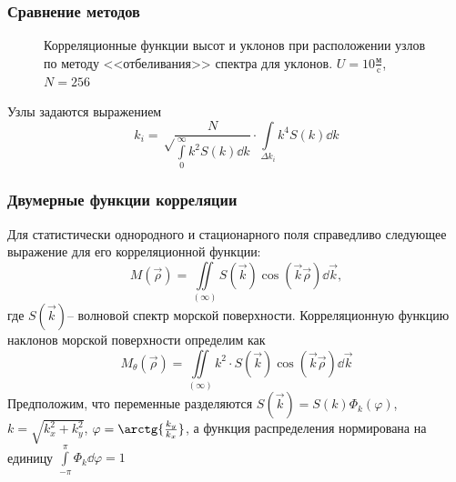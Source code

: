 \documentclass[10pt,pdf,hyperref={unicode}, dvipsnames]{beamer}
\renewcommand{\phi}{\varphi}
\begin{document}
\begin{frame}[plain]
	
	\frametitle{Сравнение методов}

   \begin{figure}[h!]
	\begin{minipage}{0.49\linewidth}
			\centering
			\label{fig:ch21}		
	\end{minipage}
	\hfill
	\begin{minipage}{0.49\linewidth}
			\centering
	\end{minipage}
	\caption{Корреляционные функции высот и уклонов при расположении узлов по методу <<отбеливания>> спектра для уклонов. $U=10 \frac{\text{м}}{\text{c}}$, $N=256$}
			\label{fig:ca21}		
\end{figure}

	Узлы задаются выражением
	\begin{equation}
	k_i=\sqrt\frac{N}{{\int\limits_{0}^{\infty} k^2 S(k) \dd{k}}}\cdot {\int\limits_{\Delta k_i} k^4 S(k) \dd{k}}
	\end{equation}



\end{frame}
\begin{frame}
	\frametitle{Двумерные функции корреляции}
	Для статистически однородного и стационарного поля справедливо следующее выражение для его корреляционной функции:
	\begin{equation}
		M(\vec \rho)= \iint\limits_{(\infty)} S(\vec k) \cos(\vec k \vec \rho) \dd{\vec k},
	\end{equation}
	где $S(\vec k)$-- волновой спектр морской поверхности.
	Корреляционную функцию наклонов морской поверхности определим как
	\begin{equation}
		M_{\theta} (\vec \rho) = \iint\limits_{(\infty)} k^2 \cdot S(\vec k) \cos(\vec k \vec \rho) \dd{ \vec k}
	\end{equation}
	Предположим, что переменные разделяются $S(\vec k)=S(k) \Phi_k(\phi)$,
	$k=\sqrt{k_x^2+k_y^2}$, $\phi=\arctg{\frac{k_y}{k_x}}$, а функция распределения нормирована на единицу $\int\limits_{-\pi}^{\pi} \Phi_k \dd{\phi}=1$
\end{frame}
\end{document}

